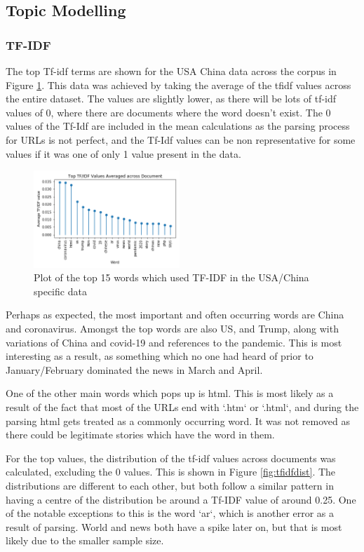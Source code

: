 \subsection{Topic Modelling}
\subsubsection{TF-IDF}
The top Tf-idf terms are shown for the USA China data across the corpus in Figure \ref{fig:tfidfusachina}. This data was achieved by taking the average of the tfidf values across the entire dataset. The values are slightly lower, as there will be lots of tf-idf values of 0, where there are documents where the word doesn't exist. The 0 values of the Tf-Idf are included in the mean calculations as the parsing process for URLs is not perfect, and the Tf-Idf values can be non representative for some values if it was one of only 1 value present in the data.

\begin{figure}[H]
	\centering
	\includegraphics[width=0.49\textwidth]{Images/usa_stem_tfidf.png}
	\caption{Plot of the top 15 words which used TF-IDF in the USA/China specific data}
	\label{fig:tfidfusachina}
\end{figure}

Perhaps as expected, the most important and often occurring words are China and coronavirus.  Amongst the top words are also US, and Trump, along with variations of China and covid-19 and references to the pandemic. This is most interesting as a result, as something which no one had heard of prior to January/February dominated the news in March and April.

One of the other main words which pops up is html. This is most likely as a result of the fact that most of the URLs end with `.htm` or `.html`, and during the parsing html gets treated as a commonly occurring word. It was not removed as there could be legitimate stories which have the word in them. 

For the top values, the distribution of the tf-idf values across documents was calculated, excluding the 0 values. This is shown in Figure \ref{fig:tfidfdist}. The distributions are different to each other, but both follow a similar pattern in having a centre of the distribution be around a Tf-IDF value of around 0.25. One of the notable exceptions to this is the word `ar`, which is another error as a result of parsing. World and news both have a spike later on, but that is most likely due to the smaller sample size.

